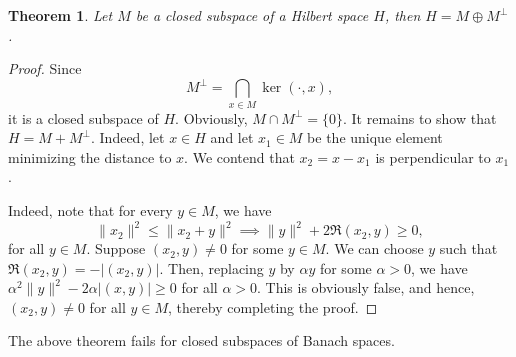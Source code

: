 \documentclass[11pt]{article}
\theoremstyle{thmstyle}
\newtheorem{theorem}{Theorem}[section]
\theoremstyle{defstyle}
\renewcommand{\le}{\leqslant}
\renewcommand{\ge}{\geqslant}
\begin{document}
\begin{theorem}
    Let $M$ be a closed subspace of a Hilbert space $H$, then $H = M\oplus M^\perp$.
\end{theorem}
\begin{proof}
    Since 
    \begin{equation*}
        M^\perp = \bigcap_{x\in M}\ker(\cdot, x),
    \end{equation*}
    it is a closed subspace of $H$. Obviously, $M\cap M^\perp = \{0\}$. It remains to show that $H = M + M^\perp$. Indeed, let $x\in H$ and let $x_1\in M$ be the unique element minimizing the distance to $x$. We contend that $x_2 = x - x_1$ is perpendicular to $x_1$.

    Indeed, note that for every $y\in M$, we have 
    \begin{equation*}
        \|x_2\|^2\le \|x_2 + y\|^2\implies \|y\|^2 + 2\Re(x_2, y)\ge 0,
    \end{equation*}
    for all $y\in M$. Suppose $(x_2, y)\ne 0$ for some $y\in M$. We can choose $y$ such that $\Re(x_2, y) = -|(x_2, y)|$. Then, replacing $y$ by $\alpha y$ for some $\alpha > 0$, we have $\alpha^2\|y\|^2 - 2\alpha|(x, y)|\ge 0$ for all $\alpha > 0$. This is obviously false, and hence, $(x_2, y)\ne 0$ for all $y\in M$, thereby completing the proof.
\end{proof}

The above theorem fails for closed subspaces of Banach spaces.
\end{document}
